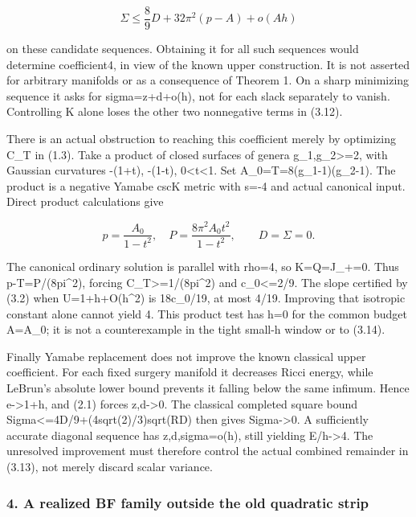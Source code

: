 \documentclass[
  10pt,
]{article}
\begin{document}
\[
                 \Sigma\le\frac89D+32\pi^2(p-A)+o(Ah)
                                                               \tag{3.14}
\]

on these candidate sequences. Obtaining it for all such sequences would
determine coefficient4, in view of the known upper construction. It is
not asserted for arbitrary manifolds or as a consequence of Theorem 1.
On a sharp minimizing sequence it asks for sigma=z+d+o(h), not for each
slack separately to vanish. Controlling K alone loses the other two
nonnegative terms in (3.12).

There is an actual obstruction to reaching this coefficient merely by
optimizing C\_T in (1.3). Take a product of closed surfaces of genera
g\_1,g\_2\textgreater=2, with Gaussian curvatures -(1+t), -(1-t),
0\textless t\textless1. Set A\_0=T=8(g\_1-1)(g\_2-1). The product is a
negative Yamabe cscK metric with s=-4 and actual canonical input. Direct
product calculations give

\[
 p=\frac{A_0}{1-t^2},\quad
 P=\frac{8\pi^2 A_0t^2}{1-t^2},\qquad D=\Sigma=0.
                                                               \tag{3.15}
\]

The canonical ordinary solution is parallel with rho=4, so K=Q=J\_+=0.
Thus p-T=P/(8pi\^{}2), forcing C\_T\textgreater=1/(8pi\^{}2) and
c\_0\textless=2/9. The slope certified by (3.2) when U=1+h+O(h\^{}2) is
18c\_0/19, at most 4/19. Improving that isotropic constant alone cannot
yield 4. This product test has h=0 for the common budget A=A\_0; it is
not a counterexample in the tight small-h window or to (3.14).

Finally Yamabe replacement does not improve the known classical upper
coefficient. For each fixed surgery manifold it decreases Ricci energy,
while LeBrun's absolute lower bound prevents it falling below the same
infimum. Hence e-\textgreater1+h, and (2.1) forces z,d-\textgreater0.
The classical completed square bound
Sigma\textless=4D/9+(4sqrt(2)/3)sqrt(RD) then gives Sigma-\textgreater0.
A sufficiently accurate diagonal sequence has z,d,sigma=o(h), still
yielding E/h-\textgreater4. The unresolved improvement must therefore
control the actual combined remainder in (3.13), not merely discard
scalar variance.

\hypertarget{a-realized-bf-family-outside-the-old-quadratic-strip}{%
\subsubsection{4. A realized BF family outside the old quadratic
strip}\label{a-realized-bf-family-outside-the-old-quadratic-strip}}
\end{document}
